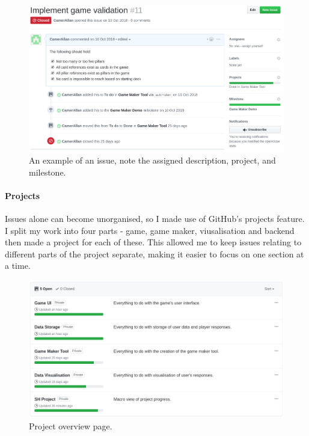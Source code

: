 \begin{figure}[!h]
	\centering
	\includegraphics[width=1.0\textwidth]{./images/softeng/issue.png}
	\caption{An example of an issue, note the assigned description, project, and milestone.}
	\label{fig:issue}
\end{figure}

\paragraph{Projects} Issues alone can become unorganised, so I made use of GitHub's projects feature. 
I split my work into four parts - game, game maker, viusalisation and backend then made a project for each of these. 
This allowed me to keep issues relating to different parts of the project separate, making it easier to focus on one section at a time.

\begin{figure}[!h]
	\centering
	\includegraphics[width=1.0\textwidth]{./images/softeng/projects.png}
	\caption{Project overview page.}
	\label{fig:projects}
\end{figure}

